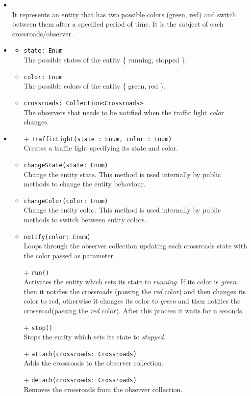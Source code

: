 \begin{itemize}
  \item \textbf{\descr} \\
    It represents an entity that has two possible colors (green, red) and switch
between them after a specified period of time. It is the subject of each 
crossroads/observer.
  \item \textbf{\attrs}
  \begin{itemize}
    \item \texttt{state: Enum} \\
The possible states of the entity \{ running, stopped \}.
    \item \texttt{color: Enum} \\
The possible colors of the entity \{ green, red \}.
    \item \texttt{crossroads: Collection<Crossroads>} \\
The observers that needs to be notified when the traffic light \textit{color} 
changes.
  \end{itemize}
  \item \textbf{\ops}
  \begin{itemize}
    \item[+] \texttt{TrafficLight(state : Enum, color : Enum)} \\
    Creates a traffic light specifying its state and color.
    \item \texttt{changeState(state: Enum)} \\
Change the entity state. This method is used internally by public methods to 
change the entity behaviour.
    \item \texttt{changeColor(color: Enum)} \\
Change the entity color. This method is used internally by public methods to 
switch between entity colors.
    \item \texttt{notify(color: Enum)} \\
Loops through the observer collection updating each crossroads state with the 
color passed as parameter. 
    \item[+] \texttt{run()} \\
Activates the entity which sets its state to \textit{running}. If its color is 
\textit{green} then it notifies the crossroads (passing the \textit{red} color)
and then changes its color to red, otherwise it changes its color to 
\textit{green} and then notifies the crossroad(passing the \textit{red} color).
After this process it waits for n seconds.    
    \item[+] \texttt{stop()} \\
Stops the entity which sets its state to \textit{stopped}.
    \item[+] \texttt{attach(crossroads: Crossroads)} \\
Adds the crossroads to the observer collection.
    \item[+] \texttt{detach(crossroads: Crossroads)} \\
Removes the crossroads from the observer collection.
  \end{itemize}
\end{itemize}

